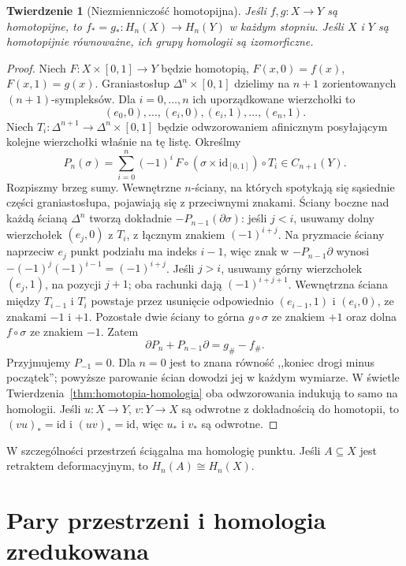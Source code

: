 \documentclass[11pt,a4paper,oneside]{report}
\newcommand{\id}{\mathrm{id}}
\theoremstyle{plain}
\newtheorem{twierdzenie}{Twierdzenie}[section]
\theoremstyle{definition}
\theoremstyle{remark}
\begin{document}
\begin{twierdzenie}[Niezmienniczość homotopijna]
\label{thm:homotopia-singularna}
Jeśli $f,g:X\to Y$ są homotopijne, to
$f_*=g_*:H_n(X)\to H_n(Y)$ w każdym stopniu.
Jeśli $X$ i $Y$ są homotopijnie równoważne,
ich grupy homologii są izomorficzne.
\end{twierdzenie}
\begin{proof}
Niech $F:X\times[0,1]\to Y$ będzie
homotopią, $F(x,0)=f(x)$,
$F(x,1)=g(x)$.
Graniastosłup $\Delta^n\times[0,1]$
dzielimy na $n+1$ zorientowanych
$(n+1)$-sympleksów. Dla $i=0,\ldots,n$
ich uporządkowane wierzchołki to
\[
 (e_0,0),\ldots,(e_i,0),
 (e_i,1),\ldots,(e_n,1).
\]
Niech $T_i:\Delta^{n+1}\to
\Delta^n\times[0,1]$ będzie odwzorowaniem
afinicznym posyłającym kolejne wierzchołki
właśnie na tę listę. Określmy
\[
 P_n(\sigma)=\sum_{i=0}^n(-1)^i\,
 F\circ(\sigma\times\id_{[0,1]})\circ T_i
 \in C_{n+1}(Y).
\]
Rozpiszmy brzeg sumy. Wewnętrzne
$n$-ściany, na których spotykają się
sąsiednie części graniastosłupa,
pojawiają się z przeciwnymi znakami.
Ściany boczne nad każdą ścianą
$\Delta^n$ tworzą dokładnie
$-P_{n-1}(\partial\sigma)$:
jeśli $j<i$, usuwamy dolny wierzchołek $(e_j,0)$
z $T_i$, z łącznym znakiem $(-1)^{i+j}$.
Na pryzmacie ściany naprzeciw $e_j$ punkt podziału ma indeks $i-1$,
więc znak w $-P_{n-1}\partial$ wynosi
$-(-1)^j(-1)^{i-1}=(-1)^{i+j}$.
Jeśli $j>i$, usuwamy górny wierzchołek $(e_j,1)$,
na pozycji $j+1$; oba rachunki dają $(-1)^{i+j+1}$.
Wewnętrzna ściana między $T_{i-1}$ i $T_i$ powstaje
przez usunięcie odpowiednio $(e_{i-1},1)$ i $(e_i,0)$,
ze znakami $-1$ i $+1$.
Pozostałe dwie ściany to górna
$g\circ\sigma$ ze znakiem $+1$
oraz dolna $f\circ\sigma$ ze
znakiem $-1$. Zatem
\begin{equation}\label{eq:prism-identity}
 \partial P_n+P_{n-1}\partial
 =g_\#-f_\#.
\end{equation}
Przyjmujemy $P_{-1}=0$. Dla $n=0$ jest to znana równość
,,koniec drogi minus początek'';
powyższe parowanie ścian dowodzi
jej w każdym wymiarze. W świetle
Twierdzenia~\ref{thm:homotopia-homologia}
oba odwzorowania indukują to samo na homologii.
Jeśli $u:X\to Y$, $v:Y\to X$
są odwrotne z dokładnością do homotopii,
to $(vu)_*=\id$ i $(uv)_*=\id$,
więc $u_*$ i $v_*$ są odwrotne.
\end{proof}

W szczególności przestrzeń ściągalna
ma homologię punktu. Jeśli
$A\subseteq X$ jest retraktem
deformacyjnym, to $H_n(A)\cong H_n(X)$.

\section{Pary przestrzeni i homologia zredukowana}
\label{sec:homologia-wzgledna}
\end{document}
